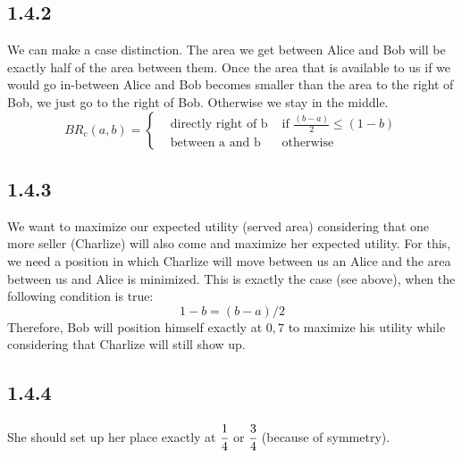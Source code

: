 \documentclass[11pt]{article}
\begin{document}
\subsection*{1.4.2}
We can make a case distinction. The area we get between Alice and Bob will be exactly half of the area between them.
Once the area that is available to us if we would go in-between Alice and Bob becomes smaller than the area to the right of
Bob, we just go to the right of Bob. Otherwise we stay in the middle.
\begin{equation}
    BR_c(a,b)=\left\{
    \begin{array}{lll}
        &\text{directly right of b } &\mbox{if } \frac{(b-a)}{2}\leq(1-b)\\
        &\mbox{between a and b}      &\text{otherwise}
    \end{array}
    \right.
\end{equation}
\subsection*{1.4.3}
We want to maximize our expected utility (served area) considering that one more seller (Charlize) will also come and maximize
her expected utility. For this, we need a position in which Charlize will move between us an Alice and the area between us and
Alice is minimized. This is exactly the case (see above), when the following condition is true:
\begin{equation}
    1-b = (b-a)/2
\end{equation}
Therefore, Bob will position himself exactly at $0,7$ to maximize his utility while considering that Charlize will still show up.

\subsection*{1.4.4}
She should set up her place exactly at $\cfrac{1}{4}$ or $\cfrac{3}{4}$ (because of symmetry).
\end{document}
